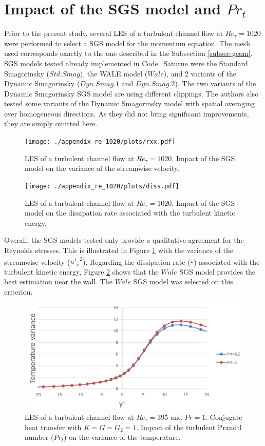 \documentclass{svjour3}                     %
\begin{document}
\section{Impact of the SGS model and $Pr_t$}
\label{sec-sgs_appendix}

Prior to the present study, several LES of a turbulent channel flow at $Re_\tau=1020$ were performed to select a SGS model for the momentum equation.
The mesh used corresponds exactly to the one described in the Subsection \ref{subsec-geom}.
SGS models tested already implemented in Code\_Saturne were the Standard Smagorinsky ($Std.Smag$), the WALE model ($Wale$), and 2 variants of the Dynamic Smagorinsky ($Dyn.Smag.1$ and $Dyn.Smag.2$).
The two variants of the Dynamic Smagorinsky SGS model are using different clippings.
The authors also tested some variants of the Dynamic Smagorinsky model with spatial averaging over homogeneous directions.
As they did not bring significant improvements, they are simply omitted here.

\begin{figure}[hbp]
\centering
\texttt{[image: ./appendix\_re\_1020/plots/rxx.pdf]}
\caption{
LES of a turbulent channel flow at $Re_\tau=1020$.
Impact of the SGS model on the variance of the streamwise velocity.
}\label{fig-sgs_rxx}
\end{figure}

\begin{figure}
\centering
\texttt{[image: ./appendix\_re\_1020/plots/diss.pdf]}
\caption{
LES of a turbulent channel flow at $Re_\tau=1020$.
Impact of the SGS model on the dissipation rate associated with the turbulent kinetic energy.
}\label{fig-sgs_diss}
\end{figure}

Overall, the SGS models tested only provide a qualitative agreement for the Reynolds stresses. 
This is illustrated in Figure \ref{fig-sgs_rxx} with the variance of the streamwise velocity ($\overline{{u'_x}^2}$).
Regarding the dissipation rate ($\varepsilon$) associated with the turbulent kinetic energy, Figure \ref{fig-sgs_diss} shows that the $Wale$ SGS model provides the best estimation near the wall.
The $Wale$ SGS model was selected on this criterion.

\begin{figure}
\centering
\includegraphics[width=\textwidth]{./images/impact_Prt_TT.png}
\caption{
LES of a turbulent channel flow at $Re_\tau=395$ and $Pr=1$.
Conjugate heat transfer with $K = G = G_2 = 1$.
Impact of the turbulent Prandtl number ($Pr_t$) on the variance of the temperature.
}\label{fig-sgs_tt}
\end{figure}
\end{document}
